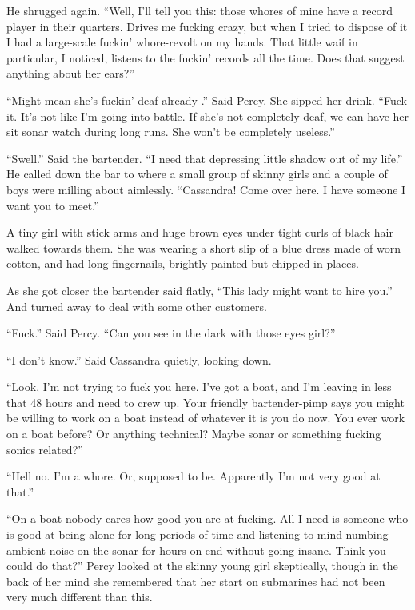 \documentclass[]{scrbook}
\begin{document}
He shrugged again. ``Well, I'll tell you this: those whores of mine have
a record player in their quarters. Drives me fucking crazy, but when I
tried to dispose of it I had a large-scale fuckin' whore-revolt on my
hands. That little waif in particular, I noticed, listens to the fuckin'
records all the time. Does that suggest anything about her ears?''

``Might mean she's fuckin' deaf already .'' Said Percy. She sipped her
drink. ``Fuck it. It's not like I'm going into battle. If she's not
completely deaf, we can have her sit sonar watch during long runs. She
won't be completely useless.''

``Swell.'' Said the bartender. ``I need that depressing little shadow
out of my life.'' He called down the bar to where a small group of
skinny girls and a couple of boys were milling about aimlessly.
``Cassandra! Come over here. I have someone I want you to meet.''

A tiny girl with stick arms and huge brown eyes under tight curls of
black hair walked towards them. She was wearing a short slip of a blue
dress made of worn cotton, and had long fingernails, brightly painted
but chipped in places.

As she got closer the bartender said flatly, ``This lady might want to
hire you.'' And turned away to deal with some other customers.

``Fuck.'' Said Percy. ``Can you see in the dark with those eyes girl?''

``I don't know.'' Said Cassandra quietly, looking down.

``Look, I'm not trying to fuck you here. I've got a boat, and I'm
leaving in less that 48 hours and need to crew up. Your friendly
bartender-pimp says you might be willing to work on a boat instead of
whatever it is you do now. You ever work on a boat before? Or anything
technical? Maybe sonar or something fucking sonics related?''

``Hell no. I'm a whore. Or, supposed to be. Apparently I'm not very good
at that.''

``On a boat nobody cares how good you are at fucking. All I need is
someone who is good at being alone for long periods of time and
listening to mind-numbing ambient noise on the sonar for hours on end
without going insane. Think you could do that?'' Percy looked at the
skinny young girl skeptically, though in the back of her mind she
remembered that her start on submarines had not been very much different
than this.
\end{document}
